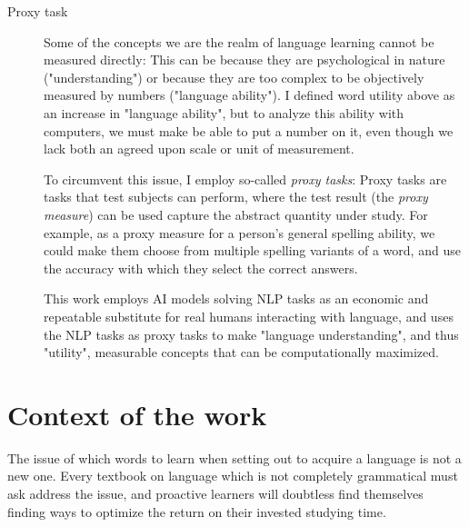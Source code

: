 \begin{description}
	\item [Proxy task]
		Some of the concepts we are the realm of language learning cannot be measured directly:
	      This can be because they are psychological in nature ("understanding") or because they are too complex to be objectively measured by numbers ("language ability").
	      I defined word utility above as an increase in "language ability", but to analyze this ability with computers, we must make be able to put a number on it, even though we lack both an agreed upon scale or unit of measurement.

	      To circumvent this issue, I employ so-called \textit{proxy tasks}:
	      Proxy tasks are tasks that test subjects can perform, where the test result (the \textit{proxy measure}) can be used capture the abstract quantity under study.
	      For example, as a proxy measure for a person's general spelling ability, we could make them choose from multiple spelling variants of a word, and use the accuracy with which they select the correct answers.

	      This work employs AI models solving NLP tasks as an economic and repeatable substitute for real humans interacting with language, and uses the NLP tasks as proxy tasks to make "language understanding", and thus "utility", measurable concepts that can be computationally maximized.
\end{description}


\section{Context of the work}

The issue of which words to learn when setting out to acquire a language is not a new one.
Every textbook on language which is not completely grammatical must ask address the issue, and proactive learners will doubtless find themselves finding ways to optimize the return on their invested studying time.

